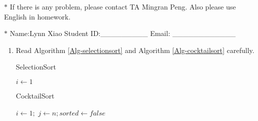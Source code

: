 \documentclass[12pt,a4paper]{article}
\theoremstyle{definition}
\begin{document}
\noindent

\noindent{}
\begin{center}
\footnotesize{\color{red}$*$ If there is any problem, please contact TA Mingran Peng. Also please use English in homework.}

\footnotesize{\color{blue}$*$ Name:Lynn Xiao  \quad Student ID:\_\_\_\_\_\_\_\_\_ \quad Email: \_\_\_\_\_\_\_\_\_\_\_\_}
\end{center}

\begin{enumerate}


\item Read Algorithm \ref{Alg-selectionsort} and Algorithm \ref{Alg-cocktailsort} carefully. \par

\begin{minipage}[t]{0.45\textwidth}
\begin{algorithm}[H]
\BlankLine
\caption{SelectionSort}
\label{Alg-selectionsort}
\BlankLine
	$i\leftarrow 1$\;

\end{algorithm}
\end{minipage}
\hfill
\begin{minipage}[t]{0.45\textwidth}
\begin{algorithm}[H]
\BlankLine
\caption{CocktailSort}
\label{Alg-cocktailsort}
\BlankLine
	$i\leftarrow 1;$ $j\leftarrow n;$$sorted\leftarrow false$\;
\end{algorithm}
\end{minipage}


\end{enumerate}
\end{document}
